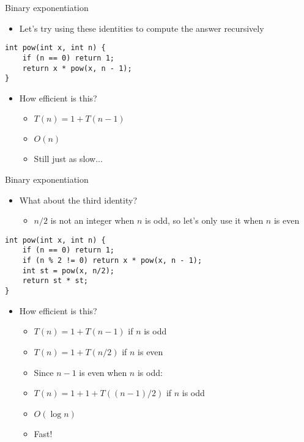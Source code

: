 \documentclass[10pt]{beamer}
\newcommand{\bi}{\begin{itemize}}
\newcommand{\ei}{\end{itemize}}
\begin{document}
\begin{frame}[fragile]{Binary exponentiation}
    \bi
        \item Let's try using these identities to compute the answer recursively
    \ei

    \vspace{10pt}

    \begin{verbatim}
int pow(int x, int n) {
    if (n == 0) return 1;
    return x * pow(x, n - 1);
}
    \end{verbatim}

    \vspace{10pt}

    \bi
        \item<2-> How efficient is this?
            \bi
                \item $T(n) = 1 + T(n-1)$
                \item<3-> $O(n)$
                \item<4-> Still just as slow...
            \ei
    \ei

\end{frame}

\begin{frame}[fragile]{Binary exponentiation}
    \bi
        \item What about the third identity?
            \bi
                \item $n/2$ is not an integer when $n$ is odd, so let's only use it when $n$ is even
            \ei
    \ei

    \begin{verbatim}
int pow(int x, int n) {
    if (n == 0) return 1;
    if (n % 2 != 0) return x * pow(x, n - 1);
    int st = pow(x, n/2);
    return st * st;
}
    \end{verbatim}

    \bi
        \item How efficient is this?
            \bi
                \item<2-> $T(n) = 1 + T(n-1)$ if $n$ is odd
                \item<2-> $T(n) = 1 + T(n/2)$ if $n$ is even
                \item<3-> Since $n-1$ is even when $n$ is odd:
                \item<3-> $T(n) = 1 + 1 + T((n-1)/2)$ if $n$ is odd
                \item<4-> $O(\log n)$
                \item<4-> Fast!
            \ei
    \ei
\end{frame}
\end{document}
